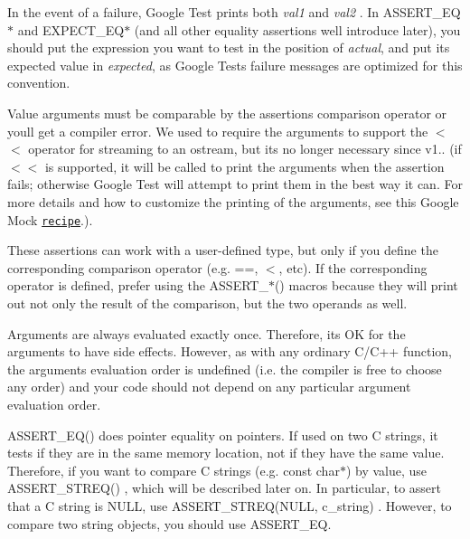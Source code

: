 In the event of a failure, Google Test prints both {\itshape val1} and {\itshape val2} . In {\ttfamily A\+S\+S\+E\+R\+T\+\_\+\+E\+Q$\ast$} and {\ttfamily E\+X\+P\+E\+C\+T\+\_\+\+E\+Q$\ast$} (and all other equality assertions we\textquotesingle{}ll introduce later), you should put the expression you want to test in the position of {\itshape actual}, and put its expected value in {\itshape expected}, as Google Test\textquotesingle{}s failure messages are optimized for this convention.

Value arguments must be comparable by the assertion\textquotesingle{}s comparison operator or you\textquotesingle{}ll get a compiler error. We used to require the arguments to support the {\ttfamily $<$$<$} operator for streaming to an {\ttfamily ostream}, but it\textquotesingle{}s no longer necessary since v1.. (if {\ttfamily $<$$<$} is supported, it will be called to print the arguments when the assertion fails; otherwise Google Test will attempt to print them in the best way it can. For more details and how to customize the printing of the arguments, see this Google Mock \href{../../googlemock/docs/CookBook.md#teaching-google-mock-how-to-print-your-values}{\tt recipe}.).

These assertions can work with a user-\/defined type, but only if you define the corresponding comparison operator (e.\+g. {\ttfamily ==}, {\ttfamily $<$}, etc). If the corresponding operator is defined, prefer using the {\ttfamily A\+S\+S\+E\+R\+T\+\_\+$\ast$()} macros because they will print out not only the result of the comparison, but the two operands as well.

Arguments are always evaluated exactly once. Therefore, it\textquotesingle{}s OK for the arguments to have side effects. However, as with any ordinary C/\+C++ function, the arguments\textquotesingle{} evaluation order is undefined (i.\+e. the compiler is free to choose any order) and your code should not depend on any particular argument evaluation order.

{\ttfamily A\+S\+S\+E\+R\+T\+\_\+\+E\+Q()} does pointer equality on pointers. If used on two C strings, it tests if they are in the same memory location, not if they have the same value. Therefore, if you want to compare C strings (e.\+g. {\ttfamily const char$\ast$}) by value, use {\ttfamily A\+S\+S\+E\+R\+T\+\_\+\+S\+T\+R\+E\+Q()} , which will be described later on. In particular, to assert that a C string is {\ttfamily N\+U\+LL}, use {\ttfamily A\+S\+S\+E\+R\+T\+\_\+\+S\+T\+R\+E\+Q(\+N\+U\+L\+L, c\+\_\+string)} . However, to compare two {\ttfamily string} objects, you should use {\ttfamily A\+S\+S\+E\+R\+T\+\_\+\+EQ}.

